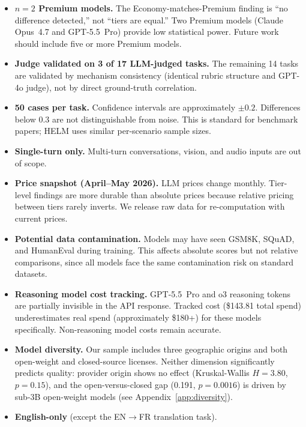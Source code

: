 \documentclass[11pt]{article}
\begin{document}
\begin{itemize}[leftmargin=*,itemsep=3pt]

\item \textbf{$n = 2$ Premium models.}  The Economy-matches-Premium
  finding is ``no difference detected,'' not ``tiers are equal.''  Two
  Premium models (Claude Opus~4.7 and GPT-5.5~Pro) provide low
  statistical power.  Future work should include five or more Premium
  models.

\item \textbf{Judge validated on 3 of 17 LLM-judged tasks.}  The
  remaining 14 tasks are validated by mechanism consistency (identical
  rubric structure and GPT-4o judge), not by direct ground-truth
  correlation.

\item \textbf{50 cases per task.}  Confidence intervals are approximately
  $\pm 0.2$.  Differences below 0.3 are not distinguishable from noise.
  This is standard for benchmark papers; HELM uses similar per-scenario
  sample sizes.

\item \textbf{Single-turn only.}  Multi-turn conversations, vision, and
  audio inputs are out of scope.

\item \textbf{Price snapshot (April--May 2026).}  LLM prices change
  monthly.  Tier-level findings are more durable than absolute prices
  because relative pricing between tiers rarely inverts.  We release raw
  data for re-computation with current prices.

\item \textbf{Potential data contamination.}  Models may have seen
  GSM8K, SQuAD, and HumanEval during training.  This affects absolute
  scores but not relative comparisons, since all models face the same
  contamination risk on standard datasets.

\item \textbf{Reasoning model cost tracking.}  GPT-5.5~Pro and o3
  reasoning tokens are partially invisible in the API response.  Tracked
  cost (\$143.81 total spend) underestimates real spend (approximately
  \$180+) for these models specifically.  Non-reasoning model costs
  remain accurate.

\item \textbf{Model diversity.}  Our sample includes three geographic
  origins and both open-weight and closed-source licenses.  Neither
  dimension significantly predicts quality: provider origin shows no
  effect (Kruskal-Wallis $H = 3.80$, $p = 0.15$), and the
  open-versus-closed gap (0.191, $p = 0.0016$) is driven by sub-3B
  open-weight models (see Appendix~\ref{app:diversity}).

\item \textbf{English-only} (except the EN$\to$FR translation task).

\end{itemize}
\end{document}
